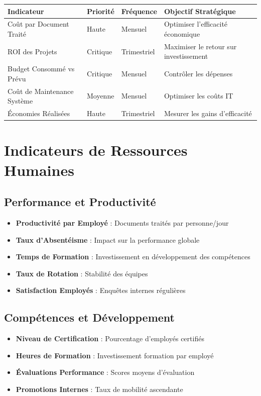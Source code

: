 \documentclass[12pt,a4paper]{article}
\begin{document}
\begin{longtable}{|p{4cm}|p{2cm}|p{2cm}|p{5cm}|}
\hline
\rowcolor{lightgray}
\textbf{Indicateur} & \textbf{Priorité} & \textbf{Fréquence} & \textbf{Objectif Stratégique} \\
\hline
\endhead

Coût par Document Traité & Haute & Mensuel & Optimiser l'efficacité économique \\
\hline
ROI des Projets & Critique & Trimestriel & Maximiser le retour sur investissement \\
\hline
Budget Consommé vs Prévu & Critique & Mensuel & Contrôler les dépenses \\
\hline
Coût de Maintenance Système & Moyenne & Mensuel & Optimiser les coûts IT \\
\hline
Économies Réalisées & Haute & Trimestriel & Mesurer les gains d'efficacité \\
\hline
\end{longtable}

\section{Indicateurs de Ressources Humaines}

\subsection{Performance et Productivité}

\begin{itemize}
    \item \textbf{Productivité par Employé} : Documents traités par personne/jour
    \item \textbf{Taux d'Absentéisme} : Impact sur la performance globale
    \item \textbf{Temps de Formation} : Investissement en développement des compétences
    \item \textbf{Taux de Rotation} : Stabilité des équipes
    \item \textbf{Satisfaction Employés} : Enquêtes internes régulières
\end{itemize}

\subsection{Compétences et Développement}

\begin{itemize}
    \item \textbf{Niveau de Certification} : Pourcentage d'employés certifiés
    \item \textbf{Heures de Formation} : Investissement formation par employé
    \item \textbf{Évaluations Performance} : Scores moyens d'évaluation
    \item \textbf{Promotions Internes} : Taux de mobilité ascendante
\end{itemize}
\end{document}

